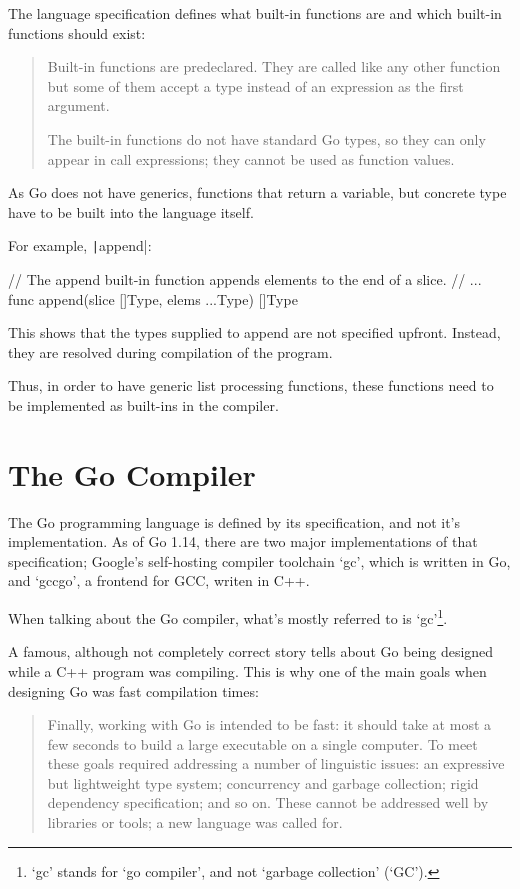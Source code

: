 The language specification defines what built-in functions are and which built-in
functions should exist:
\begin{quote}
    Built-in functions are predeclared. They are called like any other function
    but some of them accept a type instead of an expression as the first argument.

    The built-in functions do not have standard Go types, so they can only appear
    in call expressions; they cannot be used as function values.\autocite{go-spec-builtins}
\end{quote}

As Go does not have generics, functions that return a variable, but
concrete type have to be built into the language itself.

For example, \texttt|append|:
\begin{gocode}
// The append built-in function appends elements to the end of a slice.
// ...
func append(slice []Type, elems ...Type) []Type
\end{gocode}

This shows that the types supplied to append are not specified upfront. Instead, they
are resolved during compilation of the program.

Thus, in order to have generic list processing functions, these functions need to
be implemented as built-ins in the compiler.

\section{The Go Compiler}

The Go programming language is defined by its specification\autocite{go-spec}, and not
it's implementation. As of Go 1.14, there are two major implementations of that
specification; Google's self-hosting compiler toolchain `gc', which is written in
Go, and `gccgo', a frontend for GCC, writen in C++.

When talking about the Go compiler, what's mostly referred to is `gc'\footnote{`gc' stands
for `go compiler', and not `garbage collection' (`GC').}.

A famous, although not completely correct story tells about Go being designed
while a C++ program was compiling\autocite{less-is-more}.
This is why one of the main goals when designing Go was fast compilation times:
\begin{quote}
    Finally, working with Go is intended to be fast: it should take at most a few
    seconds to build a large executable on a single computer. To meet these goals
    required addressing a number of linguistic issues: an expressive but lightweight
    type system; concurrency and garbage collection; rigid dependency specification;
    and so on. These cannot be addressed well by libraries or tools; a new language
    was called for.\autocite{go-faq}
\end{quote}

